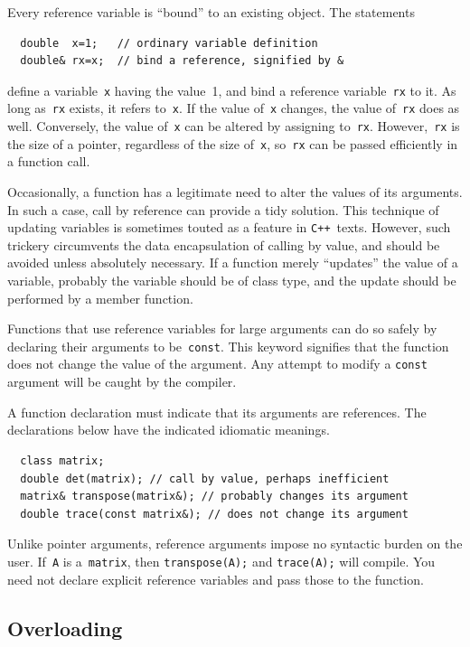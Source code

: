 \documentclass[12pt]{report}
\newcommand{\code}[1]{\texttt{#1}}
\newcommand{\CXX}{\code{C++}}
\begin{document}
Every reference variable is ``bound'' to an existing object. The
statements
\begin{verbatim}
  double  x=1;   // ordinary variable definition
  double& rx=x;  // bind a reference, signified by &
\end{verbatim}
define a variable~\code{x} having the value~1, and bind a reference
variable~\code{rx} to it. As long as~\code{rx} exists, it refers
to~\code{x}. If the value of~\code{x} changes, the value of~\code{rx}
does as well. Conversely, the value of~\code{x} can be altered by
assigning to~\code{rx}. However,~\code{rx} is the size of a pointer,
regardless of the size of~\code{x}, so~\code{rx} can be passed
efficiently in a function call.

Occasionally, a function has a legitimate need to alter the values of
its arguments. In such a case, call by reference can provide a tidy
solution. This technique of updating variables is sometimes touted as
a feature in \CXX\ texts. However, such trickery circumvents the data
encapsulation of calling by value, and should be avoided unless
absolutely necessary. If a function merely ``updates'' the value of a
variable, probably the variable should be of class type, and the
update should be performed by a member function.

Functions that use reference variables for large arguments can do so
safely by declaring their arguments to be~\code{const}. This keyword
signifies that the function does not change the value of the
argument. Any attempt to modify a \code{const} argument will be caught
by the compiler.

A function declaration must indicate that its arguments are
references. The declarations below have the indicated idiomatic
meanings.
\begin{verbatim}
  class matrix;
  double det(matrix); // call by value, perhaps inefficient
  matrix& transpose(matrix&); // probably changes its argument
  double trace(const matrix&); // does not change its argument
\end{verbatim}
Unlike pointer arguments, reference arguments impose no syntactic
burden on the user. If~\code{A} is a~\code{matrix}, then
\code{transpose(A);} and \code{trace(A);} will compile. You need not
declare explicit reference variables and pass those to the function.


\subsection*{Overloading}
\end{document}
